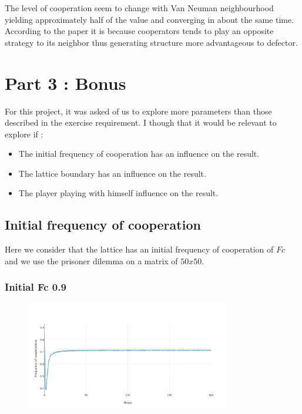 \documentclass[11pt]{article}
\begin{document}
The level of cooperation seem to change with Van Neuman neighbourhood yielding approximately half of the value and converging in about the same time. According to the paper it is because cooperators tends to play an opposite strategy to its neighbor thus generating structure more advantageous to defector.

\section{Part 3 : Bonus}

For this project, it was asked of us to explore more parameters than those described in the exercise requirement.
I though that it would be relevant to explore if : 
\begin{itemize}
	\item The initial frequency of cooperation has an influence on the result.
	\item The lattice boundary has an influence on the result.
	\item The player playing with himself influence on the result.
\end{itemize}

\subsection{Initial frequency of cooperation}

Here we consider that the lattice has an initial frequency of cooperation of $Fc$ and we use the prisoner dilemma on a matrix of $50x50$.


\subsubsection{Initial Fc 0.9}

\begin{figure}[H]
\centering
   \includegraphics[width=0.8\textwidth]{img/part3/bonus-01-D.png}
\end{figure}
\end{document}
